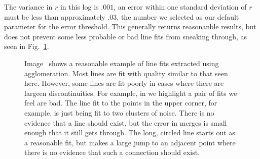 \documentclass[12pt]{article}
\begin{document}
The variance in $r$ in this log is $.001$, an error within one standard deviation
of $r$ must be less than approximately $.03$, the number we selected as our
default parameter for the error threshold.  This generally returns reasonanble results,
but does not prevent some less probable or bad line fits from sneaking through, as
seen in Fig.~\ref{fig:line_fits}.

\begin{figure}[h!]
\centering
{}
\caption{Image~ shows a reasonable example of line fits
    extracted using agglomeration. Most lines are fit with quality similar to that
    seen here. However, some lines are fit poorly in cases where there are largeen
    discontinuities. For example, in  we highlight a pair
    of fits we feel are bad. The line fit to the points in the upper corner, for
    example, is just being fit to two clusters of noise. There is no evidence
    that a line should exist, but the error in merges is small enough that it
    still gets through. The long, circled line starts out as a reasonable fit, but
    makes a large jump to an adjacent point where there is no evidence that such a
    connection should exist.
}
\label{fig:line_fits}
\end{figure}
\end{document}
